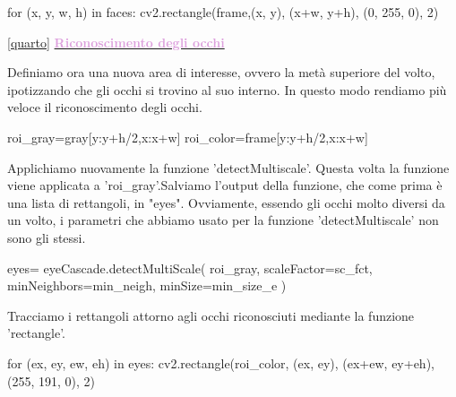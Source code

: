 \documentclass[12pt]{article}
\begin{document}
{ \begin{codice}
    for (x, y, w, h) in faces:
            cv2.rectangle(frame,(x, y), (x+w, y+h), (0, 255, 0), 2)
\end{codice}

\vspace{2cm}	  	
  	
\ref {quarto} \underline{\textbf{\textcolor{Plum}{Riconoscimento degli occhi}}}

\vspace{1cm}

Definiamo ora una nuova area di interesse, ovvero la met\`a superiore del volto, ipotizzando che gli occhi si trovino al suo interno. In questo modo rendiamo pi\`u veloce il riconoscimento degli occhi.

\vspace{1cm}


 \begin{codice}
            roi_gray=gray[y:y+h/2,x:x+w]
            roi_color=frame[y:y+h/2,x:x+w]

\end{codice}

\vspace{1cm}


Applichiamo nuovamente la funzione 'detectMultiscale'. Questa volta la funzione viene applicata a 'roi\_gray'.Salviamo l'output della funzione, che come prima \`e una lista di rettangoli, in "eyes". Ovviamente, essendo gli occhi molto diversi da un volto, i parametri che abbiamo usato per la funzione 'detectMultiscale' non sono gli stessi.
\vspace{1cm}
 
 \begin{codice}
             eyes= eyeCascade.detectMultiScale(         
                 roi_gray,
                 scaleFactor=sc_fct,
                 minNeighbors=min_neigh,
                 minSize=min_size_e
                 )  
 \end{codice}
\vspace{1cm}

Tracciamo i rettangoli attorno agli occhi riconosciuti mediante la funzione 'rectangle'.
\vspace{1cm}
 
 \begin{codice}
            for (ex, ey, ew, eh) in eyes:
                cv2.rectangle(roi_color, (ex, ey), (ex+ew, ey+eh), (255, 191, 0), 2)
\end{codice}

\vspace{2cm}
  	 	
}
\end{document}
